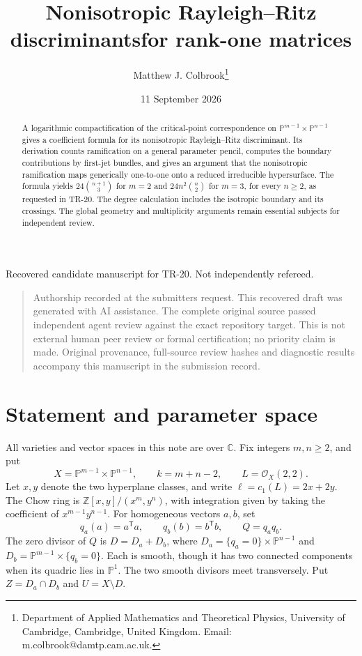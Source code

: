 \documentclass[11pt]{article}
\title{Nonisotropic Rayleigh--Ritz discriminants\newline for rank-one matrices}
\author{Matthew J. Colbrook\thanks{Department of Applied Mathematics and Theoretical Physics, University of Cambridge, Cambridge, United Kingdom. Email: m.colbrook@damtp.cam.ac.uk.}}
\date{11 September 2026}
\newcommand{\C}{\mathbb C}
\newcommand{\PP}{\mathbb P}
\newcommand{\OO}{\mathcal O}
\begin{document}
\maketitle
\begin{center}\small Recovered candidate manuscript for TR-20. Not independently refereed.\end{center}
\begin{quote}\small Authorship recorded at the submitter\textquotesingle s request. This recovered draft was generated with AI assistance. The complete original source passed independent agent review against the exact repository target. This is not external human peer review or formal certification; no priority claim is made. Original provenance, full-source review hashes and diagnostic results accompany this manuscript in the submission record.\end{quote}
\begin{abstract}
A logarithmic compactification of the critical-point correspondence
on $\PP^{m-1}\times\PP^{n-1}$ gives a coefficient formula for its
nonisotropic Rayleigh--Ritz discriminant. Its derivation counts
ramification on a general parameter pencil, computes the boundary
contributions by first-jet bundles, and gives an argument that the
nonisotropic ramification maps generically one-to-one onto a reduced
irreducible hypersurface. The formula yields
$24\binom{n+1}{3}$ for $m=2$ and $24n^2\binom n2$ for $m=3$, for every
$n\ge2$, as requested in TR-20. The degree calculation includes the
isotropic boundary and its crossings. The global geometry and
multiplicity arguments remain essential subjects for independent review.
\end{abstract}

\section{Statement and parameter space}
All varieties and vector spaces in this note are over $\C$.
Fix integers $m,n\ge2$, and put
\[
 X=\PP^{m-1}\times\PP^{n-1},\qquad k=m+n-2,\qquad L=\OO_X(2,2).
\]
Let $x,y$ denote the two hyperplane classes, and write
$\ell=c_1(L)=2x+2y$. The Chow ring is
$\mathbb Z[x,y]/(x^m,y^n)$, with integration given by taking the
coefficient of $x^{m-1}y^{n-1}$.
For homogeneous vectors $a,b$, set
\[
 q_a(a)=a^{\mathsf T}a,\qquad q_b(b)=b^{\mathsf T}b,\qquad Q=q_aq_b.
\]
The zero divisor of $Q$ is $D=D_a+D_b$, where
$D_a=\{q_a=0\}\times\PP^{n-1}$ and
$D_b=\PP^{m-1}\times\{q_b=0\}$. Each is smooth, though it has two
connected components when its quadric lies in $\PP^1$. The two
smooth divisors meet transversely. Put $Z=D_a\cap D_b$ and $U=X\setminus D$.
\end{document}
